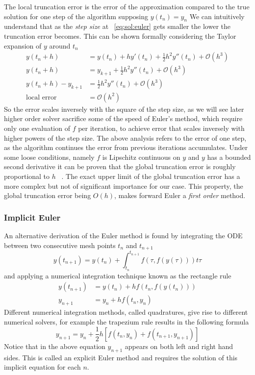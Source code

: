 \documentclass[11pt]{article}
\begin{document}
    The local truncation error is the error of the approximation compared to the true solution for one step of the
    algorithm supposing $y(t_n) = y_n$
    We can intuitively understand that as the \textit{step size} at ~\eqref{eq:sol:euler} gets smaller the lower the
    truncation error becomes.
    This can be shown formally considering the Taylor expansion of $y$ around $t_n$
    \begin{align*}
        y(t_n+h) &= y(t_n) + h y'(t_n) + \frac{1}{2} h^2 y''(t_n) + \mathcal{O}(h^3) \\
        y(t_n+h) &= y_{k+1}  + \frac{1}{2} h^2 y''(t_n) + \mathcal{O}(h^3) \\
        y(t_n+h) - y_{k+1} &= \frac{1}{2} h^2 y''(t_n) + \mathcal{O}(h^3) \\
        \text{local error} &= \mathcal{O}(h^2)
    \end{align*}
    So the error scales inversely with the square of the step size, as we will see later higher order solver sacrifice
    some of the speed of Euler's method, which require only one evaluation of $f$ per iteration, to achieve error that
    scales inversely with higher powers of the step size.
    The above analysis refers to the error of one step, as the algorithm continues the error from previous iterations
    accumulates.
    Under some loose conditions, namely $f$ is Lipschitz continuous on $y$ and $y$ has a bounded second derivative it
    can be proven that the global truncation error is roughly proportional to $h$ ~\cite{butcher2016numerical}.
    The exact upper limit of the global truncation error has a more complex but not of significant importance for our
    case.
    This property, the global truncation error being $O(h)$, makes forward Euler a \textit{first order} method.

    \subsubsection{Implicit Euler}
    An alternative derivation of the Euler method is found by integrating the ODE between two consecutive mesh points
    $t_n$ and $t_{n+1}$
    \begin{equation*}
        y(t_{n+1}) = y(t_n) + \int_{t_n}^{t_{n+1}} f(\tau, f(y( \tau)) ) t\tau
    \end{equation*}
    and applying a numerical integration technique known as the rectangle rule
    \begin{align*}
        y(t_{n+1}) &= y(t_n) + h f(t_n, f(y( t_n)) ) \\
        y_{n+1} & = y_n + hf(t_n, y_n)
    \end{align*}
    Different numerical integration methods, called quadratures, give rise to different numerical solvers, for example
    the trapezium rule results in the following formula
    \begin{equation*}
        y_{n+1} =  y_n + \frac{1}{2} h \left[ f(t_n, y_n) + f(t_{n+1}, y_{n+1})\right]
    \end{equation*}
    Notice that in the above equation $y_{n+1}$ appears on both left and right hand sides.
    This is called an explicit Euler method and requires the solution of this implicit equation for each $n$.
\end{document}
